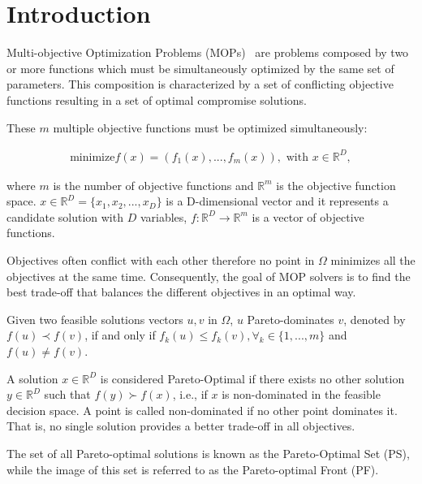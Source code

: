 \section{Introduction}

Multi-objective Optimization Problems (MOPs)~\cite{miettinen1999nonlinear} are problems composed by two or more functions which must be simultaneously optimized by the same set of parameters. This composition is characterized by a set of conflicting objective functions resulting in a set of optimal compromise solutions. 

These $m$ multiple objective functions must be optimized simultaneously:

\begin{align}\label{min_problem}
\text{minimize} f(x) = (f_1(x), ..., f_{m}(x)), \text{ with $x \in \mathbb{R}^{D}$},
\end{align}

where $m$ is the number of objective functions and $\mathbb{R}^m$ is the objective function space. $x \in \mathbb{R}^{D} = \{x_1, x_2, ..., x_D\}$ is a D-dimensional vector and it represents a candidate solution with ${D}$ variables, $f: \mathbb{R}^{D} \rightarrow \mathbb{R}^{m}$ is a vector of objective functions.%

Objectives often conflict with each other therefore no point in $\Omega$ minimizes all the objectives at the same time. Consequently, the goal of MOP solvers is to find the best trade-off that balances the different objectives in an optimal way.

Given two feasible solutions vectors $u, v$ in $\Omega$, $u$  Pareto-dominates $v$, denoted by $f(u) \prec f(v)$, if and only if $f_k(u) \leq f_k(v), \forall_k \in \{1,..., m\}$ and $ f(u) \neq f(v)$. 

A solution $x \in \mathbb{R}^{D}$ is considered Pareto-Optimal if there exists no other solution $y \in \mathbb{R}^{D}$ such that $f(y) \succ f(x)$, i.e., if $x$ is non-dominated in the feasible decision space. A point is called non-dominated if no other point dominates it. That is, no single solution provides a better trade-off in all objectives.

The set of all Pareto-optimal solutions is known as the Pareto-Optimal Set (PS), while the image of this set is referred to as the Pareto-optimal Front (PF).\\

